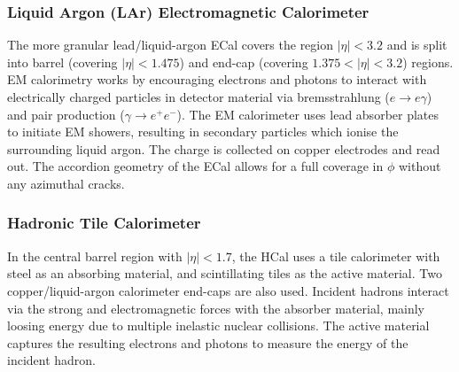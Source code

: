 \subsubsection{Liquid Argon (LAr) Electromagnetic Calorimeter}
The more granular lead/liquid-argon ECal covers the region $|\eta|< 3.2$ and is split into barrel (covering $|\eta| < 1.475$) and end-cap (covering $1.375 < |\eta| < 3.2$) regions.
EM calorimetry works by encouraging electrons and photons to interact with electrically charged particles in detector material via bremsstrahlung ($e \rightarrow e\gamma$) and pair production ($\gamma \rightarrow e^+ e^- $).
The EM calorimeter uses lead absorber plates to initiate EM showers, resulting in secondary particles which ionise the surrounding liquid argon.
The charge is collected on copper electrodes and read out.
The accordion geometry of the ECal allows for a full coverage in $\phi$ without any azimuthal cracks. 


\subsubsection{Hadronic Tile Calorimeter}
In the central barrel region with $|\eta| < 1.7$, the HCal uses a tile calorimeter with steel as an absorbing material, and scintillating tiles as the active material.
Two copper/liquid-argon calorimeter end-caps are also used.
Incident hadrons interact via the strong and electromagnetic forces with the absorber material, mainly loosing energy due to multiple inelastic nuclear collisions.
The active material captures the resulting electrons and photons to measure the energy of the incident hadron.





